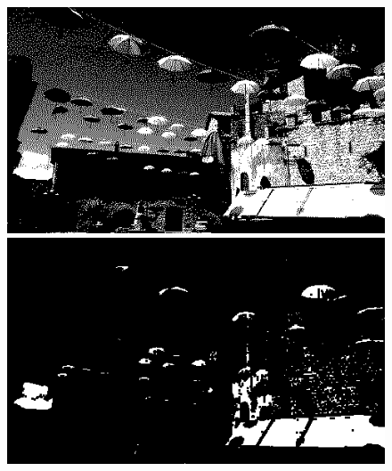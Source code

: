 \documentclass{article}
\begin{document}
	\begin{figure}[!ht]	
	\centering	
	\includegraphics[scale=1.2]{img/mono-obraz1}
	\includegraphics[scale=0.288]{img/morfologiczne/erozja-mono}
	

\end{figure}
\end{document}
